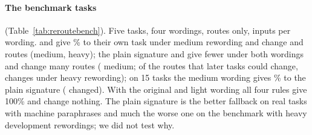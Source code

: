 \paragraph{The benchmark tasks} (Table~\ref{tab:reroutebench}). Five tasks, four wordings, routes only, \RerouteBenchInputs{} inputs per wording. \cert{} and \nearest{} give \RerouteCertBenchFiveMediumOwn{}\% to their own task under medium rewording and change \RerouteCertBenchFiveMediumChanged{} and \RerouteCertBenchFiveHeavyChanged{} routes (medium, heavy); the plain signature and \hybrid{} give fewer under both wordings and change many routes (\RerouteSigBenchFiveMediumChanged{} medium; of the \RerouteBenchChangeable{} routes that later tasks could change, \hybrid{} changes \RerouteHybBenchFiveHeavyChanged{} under heavy rewording); on 15 tasks the medium wording gives \RerouteSigBenchFifteenMediumOwn{}\% to the plain signature (\RerouteSigBenchFifteenMediumChanged{} changed). With the original and light wording all four rules give 100\% and change nothing. The plain signature is the better fallback on real tasks with machine paraphrases and much the worse one on the benchmark with heavy development rewordings; we did not test why.

